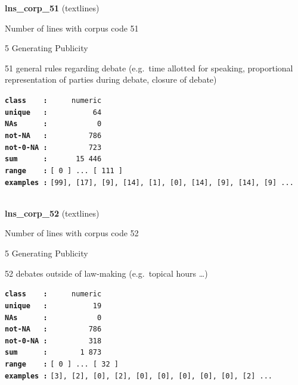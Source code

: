 \documentclass[]{article}
\begin{document}
\textbf{lns\_corp\_51} (textlines)

Number of lines with corpus code 51

5 Generating Publicity

51 general rules regarding debate (e.g.~time allotted for speaking,
proportional representation of parties during debate, closure of debate)

\textbf{\texttt{class\ \ \ \ :}} \texttt{~~~~~numeric}\\
\textbf{\texttt{unique\ \ \ :}} \texttt{~~~~~~~~~~64}\\
\textbf{\texttt{NAs\ \ \ \ \ \ :}} \texttt{~~~~~~~~~~~0}\\
\textbf{\texttt{not-NA\ \ \ :}} \texttt{~~~~~~~~~786}\\
\textbf{\texttt{not-0-NA\ :}} \texttt{~~~~~~~~~723}\\
\textbf{\texttt{sum\ \ \ \ \ \ :}} \texttt{~~~~~~15~446}\\
\textbf{\texttt{range\ \ \ \ :}}
\texttt{{[}\ 0\ {]}\ ...\ {[}\ 111\ {]}}\\
\textbf{\texttt{examples\ :}}
\texttt{{[}99{]},\ {[}17{]},\ {[}9{]},\ {[}14{]},\ {[}1{]},\ {[}0{]},\ {[}14{]},\ {[}9{]},\ {[}14{]},\ {[}9{]}\ ...}\\

~

\textbf{lns\_corp\_52} (textlines)

Number of lines with corpus code 52

5 Generating Publicity

52 debates outside of law-making (e.g.~topical hours \ldots{})

\textbf{\texttt{class\ \ \ \ :}} \texttt{~~~~~numeric}\\
\textbf{\texttt{unique\ \ \ :}} \texttt{~~~~~~~~~~19}\\
\textbf{\texttt{NAs\ \ \ \ \ \ :}} \texttt{~~~~~~~~~~~0}\\
\textbf{\texttt{not-NA\ \ \ :}} \texttt{~~~~~~~~~786}\\
\textbf{\texttt{not-0-NA\ :}} \texttt{~~~~~~~~~318}\\
\textbf{\texttt{sum\ \ \ \ \ \ :}} \texttt{~~~~~~~1~873}\\
\textbf{\texttt{range\ \ \ \ :}}
\texttt{{[}\ 0\ {]}\ ...\ {[}\ 32\ {]}}\\
\textbf{\texttt{examples\ :}}
\texttt{{[}3{]},\ {[}2{]},\ {[}0{]},\ {[}2{]},\ {[}0{]},\ {[}0{]},\ {[}0{]},\ {[}0{]},\ {[}0{]},\ {[}2{]}\ ...}\\
\end{document}
